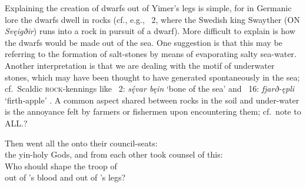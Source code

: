 {{Explaining the creation of dwarfs out of Yimer’s legs is simple, for in Germanic lore the dwarfs dwell in rocks (cf., e.g., \Ynglingatal\ 2, where the Swedish king Swayther (ON \emph{Svęigðir}) runs into a rock in pursuit of a dwarf).
More difficult to explain is how the dwarfs would be made out of the sea.  One suggestion is that this may be referring to the formation of salt-stones by means of evaporating salty sea-water.  Another interpretation is that we are dealing with the motif of underwater stones, which may have been thought to have generated spontaneously in the sea; cf.~Scaldic \textsc{rock}-kennings like \Haleygjatal\ 2: \emph{sę́var bęin} ‘bone of the sea’ and \Thorsdrapa\ 16: \emph{fjarð-ępli} ‘firth-apple’ \parencite[90]{Meissner1921}.  A common aspect shared between rocks in the soil and under-water is the annoyance felt by farmers or fishermen upon encountering them; cf.~note to ALL.}}?\eva

\bvb Then went all the  onto their council-seats: \\
the yin-holy Gods, and from each other took counsel of this: \\
Who should shape the troop of  \\
out of ’s blood and out of ’s legs?\evb\evg


